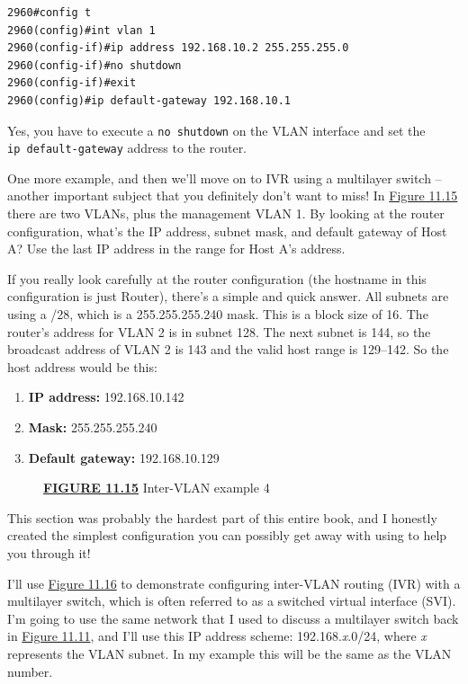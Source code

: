 \begin{verbatim}
2960#config t
2960(config)#int vlan 1
2960(config-if)#ip address 192.168.10.2 255.255.255.0
2960(config-if)#no shutdown
2960(config-if)#exit
2960(config)#ip default-gateway 192.168.10.1
\end{verbatim}

Yes, you have to execute a \texttt{no\ shutdown} on the VLAN interface
and set the \texttt{ip\ default-gateway} address to the router.

One more example, and then we'll move on to IVR using a multilayer
switch -- another important subject that you definitely don't want to
miss! In \protect\hyperlink{c11.xhtmlux5cux23figure11-15}{Figure 11.15}
there are two VLANs, plus the management VLAN 1. By looking at the
router configuration, what's the IP address, subnet mask, and default
gateway of Host A? Use the last IP address in the range for Host A's
address.

If you really look carefully at the router configuration (the hostname
in this configuration is just Router), there's a simple and quick
answer. All subnets are using a /28, which is a 255.255.255.240 mask.
This is a block size of 16. The router's address for VLAN 2 is in subnet
128. The next subnet is 144, so the broadcast address of VLAN 2 is 143
and the valid host range is 129--142. So the host address would be this:

\begin{enumerate}
\tightlist
\item
  \textbf{IP address:} 192.168.10.142
\item
  \textbf{Mask:} 255.255.255.240
\item
  \textbf{Default gateway:} 192.168.10.129
\end{enumerate}



\begin{figure}
\centering
\caption{{\protect\hyperlink{c11.xhtmlux5cux23figureanchor11-15}{\textbf{FIGURE
11.15}} Inter-VLAN example 4}}
\end{figure}

This section was probably the hardest part of this entire book, and I
honestly created the simplest configuration you can possibly get away
with using to help you through it!

I'll use \protect\hyperlink{c11.xhtmlux5cux23figure11-16}{Figure 11.16}
to demonstrate configuring inter-VLAN routing (IVR) with a multi­layer
switch, which is often referred to as a switched virtual interface
(SVI). I'm going to use the same network that I used to discuss a
multilayer switch back in
\protect\hyperlink{c11.xhtmlux5cux23figure11-11}{Figure 11.11}, and I'll
use this IP address scheme: 192.168.\emph{x}.0/24, where \emph{x}
represents the VLAN subnet. In my example this will be the same as the
VLAN number.

